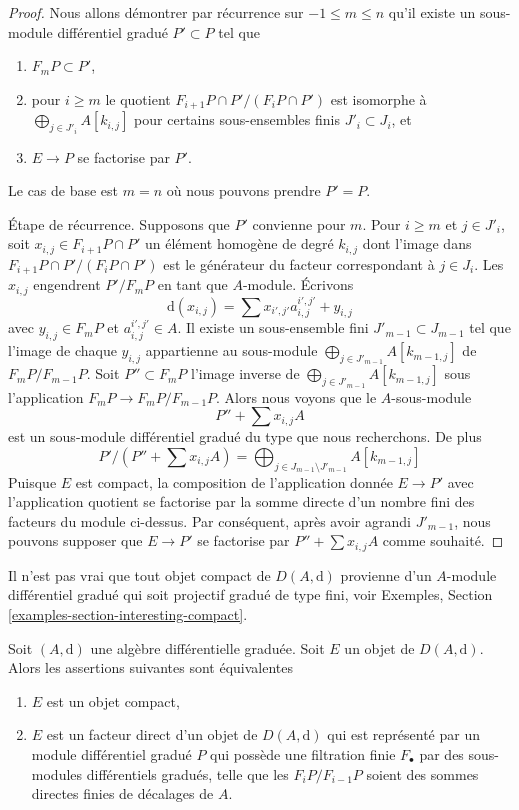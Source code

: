 \begin{proof}
Nous allons démontrer par récurrence sur $-1 \leq m \leq n$ qu'il existe un
sous-module différentiel gradué $P' \subset P$ tel que
\begin{enumerate}
\item $F_mP \subset P'$,
\item pour $i \geq m$ le quotient $F_{i + 1}P \cap P'/(F_iP \cap P')$ est
isomorphe à $\bigoplus_{j \in J'_i} A[k_{i, j}]$ pour certains sous-ensembles
finis $J'_i \subset J_i$, et
\item $E \to P$ se factorise par $P'$.
\end{enumerate}
Le cas de base est $m = n$ où nous pouvons prendre $P' = P$.

\medskip\noindent
Étape de récurrence. Supposons que $P'$ convienne pour $m$. Pour $i \geq m$ et $j
\in J'_i$, soit $x_{i, j} \in F_{i + 1}P \cap P'$ un élément homogène de degré
$k_{i, j}$ dont l'image dans $F_{i + 1}P \cap P'/(F_iP \cap P')$ est le générateur
du facteur correspondant à $j \in J_i$. Les $x_{i, j}$ engendrent $P'/F_mP$ en tant
que $A$-module. Écrivons
$$
\text{d}(x_{i, j}) = \sum x_{i', j'} a_{i, j}^{i', j'} + y_{i, j}
$$
avec $y_{i, j} \in F_mP$ et $a_{i, j}^{i', j'} \in A$. Il existe un sous-ensemble
fini $J'_{m - 1} \subset J_{m - 1}$ tel que l'image de chaque $y_{i, j}$
appartienne au sous-module $\bigoplus_{j \in J'_{m - 1}} A[k_{m - 1, j}]$ de
$F_mP/F_{m - 1}P$. Soit $P'' \subset F_mP$ l'image inverse de $\bigoplus_{j \in
J'_{m - 1}} A[k_{m - 1, j}]$ sous l'application $F_mP \to F_mP/F_{m - 1}P$. Alors
nous voyons que le $A$-sous-module
$$
P'' + \sum x_{i, j}A
$$
est un sous-module différentiel gradué du type que nous recherchons. De plus
$$
P'/(P'' + \sum x_{i, j}A) =
\bigoplus\nolimits_{j \in J_{m - 1} \setminus J'_{m - 1}} A[k_{m - 1, j}]
$$
Puisque $E$ est compact, la composition de l'application donnée $E \to P'$ avec
l'application quotient se factorise par la somme directe d'un nombre fini des facteurs du module
ci-dessus. Par conséquent, après avoir agrandi $J'_{m - 1}$, nous pouvons supposer
que $E \to P'$ se factorise par $P'' + \sum x_{i, j}A$ comme souhaité.
\end{proof}

\noindent
Il n'est pas vrai que tout objet compact de $D(A, \text{d})$ provienne d'un
$A$-module différentiel gradué qui soit projectif gradué de type fini, voir Exemples, Section
\ref{examples-section-interesting-compact}.

\begin{proposition}
\label{proposition-compact}
Soit $(A, \text{d})$ une algèbre différentielle graduée. Soit $E$ un objet de
$D(A, \text{d})$. Alors les assertions suivantes sont équivalentes
\begin{enumerate}
\item $E$ est un objet compact,
\item $E$ est un facteur direct d'un objet de $D(A, \text{d})$ qui est représenté
par un module différentiel gradué $P$ qui possède une filtration finie $F_\bullet$
par des sous-modules différentiels gradués, telle que les $F_iP/F_{i - 1}P$ soient des
sommes directes finies de décalages de $A$.
\end{enumerate}
\end{proposition}

